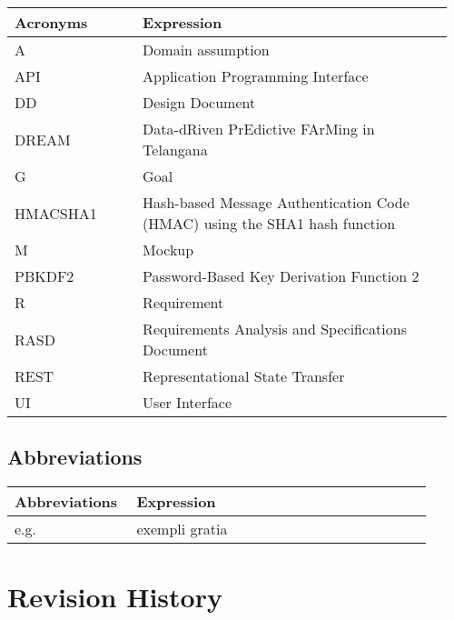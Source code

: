 \begin{center}
	\begin{longtable}{@{}p{0.28\linewidth} p{0.68\linewidth}@{}}
		\toprule
		\textbf{Acronyms}   & \textbf{Expression}\\
		\endfirsthead
		\midrule
		A                   & Domain assumption\\
		API                 & Application Programming Interface\\
		DD                  & Design Document\\
		DREAM               & Data-dRiven PrEdictive FArMing in Telangana\\
		G					& Goal\\
		HMACSHA1            & Hash-based Message Authentication Code (HMAC) using the SHA1 hash function \\
		M					& Mockup\\
		PBKDF2              & Password-Based Key Derivation Function 2 \\ 
		R                   & Requirement\\
		RASD                & Requirements Analysis and Specifications Document\\
		REST				& Representational State Transfer\\
		UI				  	& User Interface\\
		\bottomrule
	\end{longtable}
\end{center}

\subsection{Abbreviations}

\begin{center}
	\begin{longtable}{@{}p{0.28\linewidth} p{0.68\linewidth}@{}}
		\toprule
		\textbf{Abbreviations}  & \textbf{Expression}\\
		\midrule
	    e.g. & exempli gratia\\
		\bottomrule
	\end{longtable}
\end{center}

\section{Revision History}

